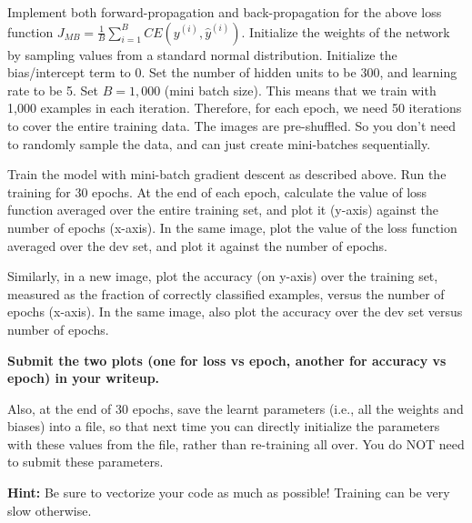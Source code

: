 \item {} 

Implement both forward-propagation and back-propagation for the above loss function $J_{MB} = \frac{1}{B}\sum_{i=1}^{B}CE(y^{(i)}, \hat{y}^{(i)})$.
Initialize the weights of the network by sampling values from a standard normal
distribution. Initialize the bias/intercept term to 0.
Set the number of hidden units to be 300, and learning rate to be 5. Set $B = 1,000$
(mini batch size). This means that we train with 1,000 examples in each iteration.
Therefore, for each epoch, we need 50 iterations to cover the entire training data.
The images are pre-shuffled. So you don't need to randomly sample the data, and can
just create mini-batches sequentially.


Train the model with mini-batch gradient descent
as described above. Run the training for 30 epochs. At the end of each epoch, calculate
the value of loss function averaged over the entire training set, and plot it
(y-axis) against the number of epochs (x-axis). In the same image, plot the value
of the loss function averaged over the dev set, and plot it against the number of epochs.

Similarly, in a new image, plot the accuracy (on y-axis) over the training set,
measured as the fraction of correctly classified examples, versus the number of epochs
(x-axis). In the same image, also plot the accuracy over the dev set versus number of epochs.

\textbf{Submit the two plots (one for loss vs epoch, another for accuracy vs epoch) in your writeup.}

Also, at the end of 30 epochs, save the learnt parameters (i.e., all the weights and biases)
into a file, so that next time you can directly initialize the parameters with
these values from the file, rather than re-training all over. You do NOT need to
submit these parameters.


\textbf{Hint:} Be sure to vectorize your code as much as possible! Training can be
very slow otherwise.
